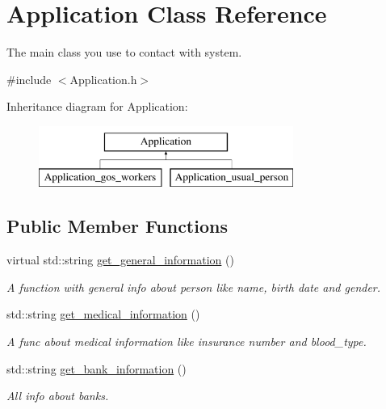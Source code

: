 \hypertarget{classApplication}{}\section{Application Class Reference}
\label{classApplication}


The main class you use to contact with system.  




{\ttfamily \#include $<$Application.\+h$>$}

Inheritance diagram for Application\+:\begin{figure}[H]
\begin{center}
\leavevmode
\includegraphics[height=2.000000cm]{classApplication}
\end{center}
\end{figure}
\subsection*{Public Member Functions}
\begin{DoxyCompactItemize}
\item 
virtual std\+::string \mbox{\hyperlink{classApplication_ab53eea16f9023504def363a58eee2240}{get\+\_\+general\+\_\+information}} ()
\begin{DoxyCompactList}\small\item\em A function with general info about person like name, birth date and gender. \end{DoxyCompactList}\item 
std\+::string \mbox{\hyperlink{classApplication_ade6d895ba440d17e12b21baf93bc8312}{get\+\_\+medical\+\_\+information}} ()
\begin{DoxyCompactList}\small\item\em A func about medical information like insurance number and blood\+\_\+type. \end{DoxyCompactList}\item 
std\+::string \mbox{\hyperlink{classApplication_a7900e26bc4f0e728af2f09f231d4d930}{get\+\_\+bank\+\_\+information}} ()
\begin{DoxyCompactList}\small\item\em All info about banks. \end{DoxyCompactList}\end{DoxyCompactItemize}


